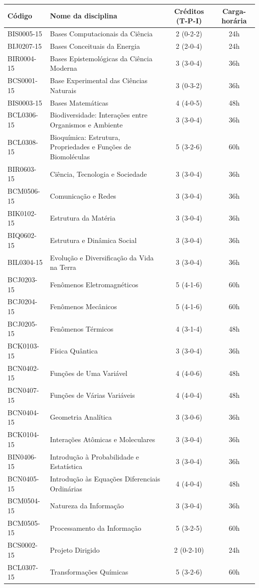 \documentclass{article}
\begin{document}
\begin{table}[!h]
\begin{longtable}{|l|p{}|c|c|}
\hline
Código & Nome da disciplina & Créditos (T-P-I) & Carga-horária\\
\hline\hline
BIS0005-15 & Bases Computacionais da Ciência & 2 (0-2-2) & 24h\\
\hline
BIJ0207-15 & Bases Conceituais da Energia & 2 (2-0-4) & 24h\\
\hline
BIR0004-15 & Bases Epistemológicas da Ciência Moderna & 3 (3-0-4) & 36h\\
\hline
BCS0001-15 & Base Experimental das Ciências Naturais & 3 (0-3-2) & 36h\\
\hline
BIS0003-15 & Bases Matemáticas & 4 (4-0-5) & 48h\\
\hline
BCL0306-15 & Biodiversidade: Interações entre Organismos e Ambiente & 3 (3-0-4) & 36h\\
\hline
BCL0308-15 & Bioquímica: Estrutura, Propriedades e Funções de Biomoléculas & 5 (3-2-6) & 60h\\
\hline
BIR0603-15 & Ciência, Tecnologia e Sociedade & 3 (3-0-4) & 36h\\
\hline
BCM0506-15 & Comunicação e Redes & 3 (3-0-4) & 36h\\
\hline
BIK0102-15 & Estrutura da Matéria & 3 (3-0-4) & 36h\\
\hline
BIQ0602-15 & Estrutura e Dinâmica Social & 3 (3-0-4) & 36h \\
\hline
BIL0304-15 & Evolução e Diversificação da Vida na Terra & 3 (3-0-4) & 36h\\
\hline
BCJ0203-15 & Fenômenos Eletromagnéticos & 5 (4-1-6) & 60h\\
\hline
BCJ0204-15 & Fenômenos Mecânicos & 5 (4-1-6) & 60h \\
\hline
BCJ0205-15 & Fenômenos Térmicos & 4 (3-1-4) & 48h\\
\hline
BCK0103-15 & Física Quântica & 3 (3-0-4) & 36h\\
\hline
BCN0402-15 & Funções de Uma Variável & 4 (4-0-6) & 48h\\
\hline
BCN0407-15 & Funções de Várias Variáveis & 4 (4-0-4) & 48h \\
\hline
BCN0404-15 & Geometria Analítica & 3 (3-0-6) & 36h\\
\hline
BCK0104-15 & Interações Atômicas e Moleculares & 3 (3-0-4) & 36h\\
\hline
BIN0406-15 & Introdução à Probabilidade e Estatística & 3 (3-0-4) & 36h\\
\hline
BCN0405-15 & Introdução às Equações Diferenciais Ordinárias & 4 (4-0-4) & 48h \\
\hline
BCM0504-15 & Natureza da Informação & 3 (3-0-4) & 36h\\
\hline
BCM0505-15 & Processamento da Informação & 5 (3-2-5) & 60h\\
\hline
BCS0002-15 & Projeto Dirigido & 2 (0-2-10) & 24h\\
\hline
BCL0307-15 & Transformações Químicas & 5 (3-2-6) & 60h\\


\end{longtable}
\end{table}
\end{document}

